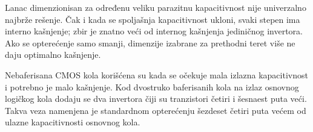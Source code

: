 Lanac dimenzionisan za određenu veliku parazitnu kapacitivnost nije univerzalno najbrže rešenje. Čak i kada se spoljašnja kapacitivnost ukloni, svaki stepen ima interno kašnjenje; zbir je znatno veći od internog kašnjenja jediničnog invertora. Ako se opterećenje samo smanji, dimenzije izabrane za prethodni teret više ne daju optimalno kašnjenje.

Nebaferisana CMOS kola korišćena su kada se očekuje mala izlazna kapacitivnost i potrebno je malo kašnjenje. Kod dvostruko baferisanih kola na izlaz osnovnog logičkog kola dodaju se dva invertora čiji su tranzistori četiri i šesnaest puta veći. Takva veza namenjena je standardnom opterećenju šezdeset četiri puta većem od ulazne kapacitivnosti osnovnog kola.
